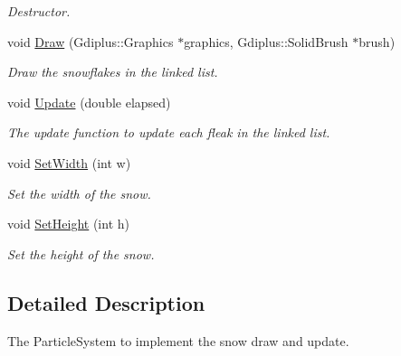 \begin{DoxyCompactItemize}
\begin{DoxyCompactList}\small\item\em Destructor. \end{DoxyCompactList}\item 
void \hyperlink{class_c_particle_system_a88c6b477ef797e66bc3407b55763cbe1}{Draw} (Gdiplus\+::\+Graphics $\ast$graphics, Gdiplus\+::\+Solid\+Brush $\ast$brush)
\begin{DoxyCompactList}\small\item\em Draw the snowflakes in the linked list. \end{DoxyCompactList}\item 
void \hyperlink{class_c_particle_system_a5e7c19dbfea60bb422e98ae79aa56692}{Update} (double elapsed)
\begin{DoxyCompactList}\small\item\em The update function to update each fleak in the linked list. \end{DoxyCompactList}\item 
\hypertarget{class_c_particle_system_a1d402912cabfb3914f42ce3273e8b9e4}{void \hyperlink{class_c_particle_system_a1d402912cabfb3914f42ce3273e8b9e4}{Set\+Width} (int w)}\label{class_c_particle_system_a1d402912cabfb3914f42ce3273e8b9e4}

\begin{DoxyCompactList}\small\item\em Set the width of the snow. \end{DoxyCompactList}\item 
\hypertarget{class_c_particle_system_a6e91260e2897f0f44464ea6a1be7a093}{void \hyperlink{class_c_particle_system_a6e91260e2897f0f44464ea6a1be7a093}{Set\+Height} (int h)}\label{class_c_particle_system_a6e91260e2897f0f44464ea6a1be7a093}

\begin{DoxyCompactList}\small\item\em Set the height of the snow. \end{DoxyCompactList}\end{DoxyCompactItemize}


\subsection{Detailed Description}
The Particle\+System to implement the snow draw and update. 

